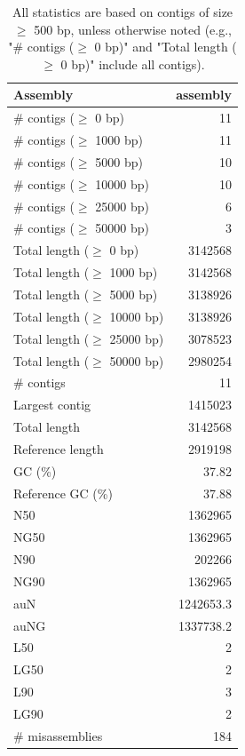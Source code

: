 \documentclass[12pt,a4paper]{article}
\begin{document}
\begin{table}[ht]
\begin{center}
\caption{All statistics are based on contigs of size $\geq$ 500 bp, unless otherwise noted (e.g., "\# contigs ($\geq$ 0 bp)" and "Total length ($\geq$ 0 bp)" include all contigs).}
\begin{tabular}{|l*{1}{|r}|}
\hline
Assembly & assembly \\ \hline
\# contigs ($\geq$ 0 bp) & 11 \\ \hline
\# contigs ($\geq$ 1000 bp) & 11 \\ \hline
\# contigs ($\geq$ 5000 bp) & 10 \\ \hline
\# contigs ($\geq$ 10000 bp) & 10 \\ \hline
\# contigs ($\geq$ 25000 bp) & 6 \\ \hline
\# contigs ($\geq$ 50000 bp) & 3 \\ \hline
Total length ($\geq$ 0 bp) & 3142568 \\ \hline
Total length ($\geq$ 1000 bp) & 3142568 \\ \hline
Total length ($\geq$ 5000 bp) & 3138926 \\ \hline
Total length ($\geq$ 10000 bp) & 3138926 \\ \hline
Total length ($\geq$ 25000 bp) & 3078523 \\ \hline
Total length ($\geq$ 50000 bp) & 2980254 \\ \hline
\# contigs & 11 \\ \hline
Largest contig & 1415023 \\ \hline
Total length & 3142568 \\ \hline
Reference length & 2919198 \\ \hline
GC (\%) & 37.82 \\ \hline
Reference GC (\%) & 37.88 \\ \hline
N50 & 1362965 \\ \hline
NG50 & 1362965 \\ \hline
N90 & 202266 \\ \hline
NG90 & 1362965 \\ \hline
auN & 1242653.3 \\ \hline
auNG & 1337738.2 \\ \hline
L50 & 2 \\ \hline
LG50 & 2 \\ \hline
L90 & 3 \\ \hline
LG90 & 2 \\ \hline
\# misassemblies & 184 \\ \hline

\end{tabular}
\end{center}
\end{table}
\end{document}
